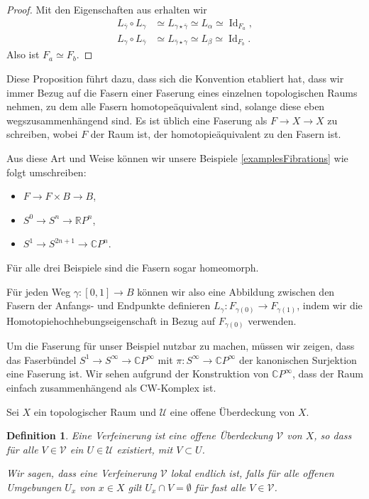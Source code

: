 \documentclass[12pt, hidelinks]{article}
\numberwithin{conj}{section}
\newtheorem{definition}[conj]{Definition}
\begin{document}
\begin{proof}
Mit den Eigenschaften aus \cite[Prop. 4.61]{hatcher2001} erhalten wir
\begin{align}
L_{\overline{\gamma}} \circ L_\gamma &\simeq L_{\gamma \star \overline{\gamma}} \simeq L_\alpha \simeq \operatorname{Id}_{F_a}, \\
L_{\gamma} \circ L_{\overline{\gamma}} &\simeq L_{\overline{\gamma} \star \gamma} \simeq L_\beta \simeq \operatorname{Id}_{F_b}.
\end{align}
Also ist $F_a \simeq F_b$.
\end{proof}
Diese Proposition führt dazu, dass sich die Konvention etabliert hat, dass wir immer Bezug auf die Fasern einer Faserung eines einzelnen topologischen Raums nehmen, zu dem alle Fasern homotopeäquivalent sind, solange diese eben wegszusammenhängend sind. Es ist üblich eine Faserung als $F \to X \to X$ zu schreiben, wobei $F$ der Raum ist, der homotopieäquivalent zu den Fasern ist.

Aus diese Art und Weise können wir unsere Beispiele \ref{examplesFibrations} wie folgt umschreiben:
\begin{itemize}[nolistsep]
    \item $F \to F \times B \to B$,
    \item $S^0 \to S^n \to \mathbb{R}P^n$,
    \item $S^1 \to S^{2n+1} \to \mathbb{C}P^n$.
\end{itemize}
Für alle drei Beispiele sind die Fasern sogar homeomorph.

Für jeden Weg $\gamma: [0,1] \to B$ können wir also eine Abbildung zwischen den Fasern der Anfangs- und Endpunkte definieren $L_\gamma: F_{\gamma(0)} \to F_{\gamma(1)}$, indem wir die Homotopiehochhebungseigenschaft in Bezug auf $F_{\gamma(0)}$ verwenden.

Um die Faserung für unser Beispiel nutzbar zu machen, müssen wir zeigen, dass das Faserbündel $S^1 \to S^\infty \to \mathbb{C}P^\infty$ mit $\pi: S^\infty \to \mathbb{C}P^\infty$ der kanonischen Surjektion eine Faserung ist. Wir sehen aufgrund der Konstruktion von $\mathbb{C}P^\infty$, dass der Raum einfach zusammenhängend als CW-Komplex ist.

Sei $X$ ein topologischer Raum und $\mathcal{U}$ eine offene Überdeckung von $X$.

\begin{definition}
Eine Verfeinerung ist eine offene Überdeckung $\mathcal{V}$ von $X$, so dass für alle $V \in \mathcal{V}$ ein $U \in \mathcal{U}$ existiert, mit $V \subset U$.

Wir sagen, dass eine Verfeinerung $\mathcal{V}$ lokal endlich ist, falls für alle offenen Umgebungen $U_x$ von $x \in X$ gilt $U_x \cap V = \emptyset$ für fast alle $V \in \mathcal{V}$.
\end{definition}
\end{document}
